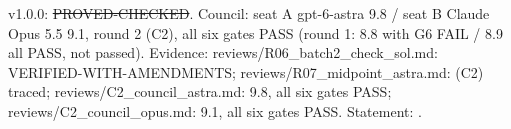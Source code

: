 \begin{theorem}\label{reg:W3-RM_RM-R}
\end{theorem}
\begin{statusbox}
 v1.0.0: \st{PROVED-CHECKED}. Council: seat A gpt-6-astra 9.8 / seat B Claude Opus 5.5 9.1, round 2 (C2), all six gates PASS (round 1: 8.8 with G6 FAIL / 8.9 all PASS, not passed). Evidence: reviews/R06\_batch2\_check\_sol.md: VERIFIED-WITH-AMENDMENTS; reviews/R07\_midpoint\_astra.md: (C2) traced; reviews/C2\_council\_astra.md: 9.8, all six gates PASS; reviews/C2\_council\_opus.md: 9.1, all six gates PASS. Statement: .
\end{statusbox}
